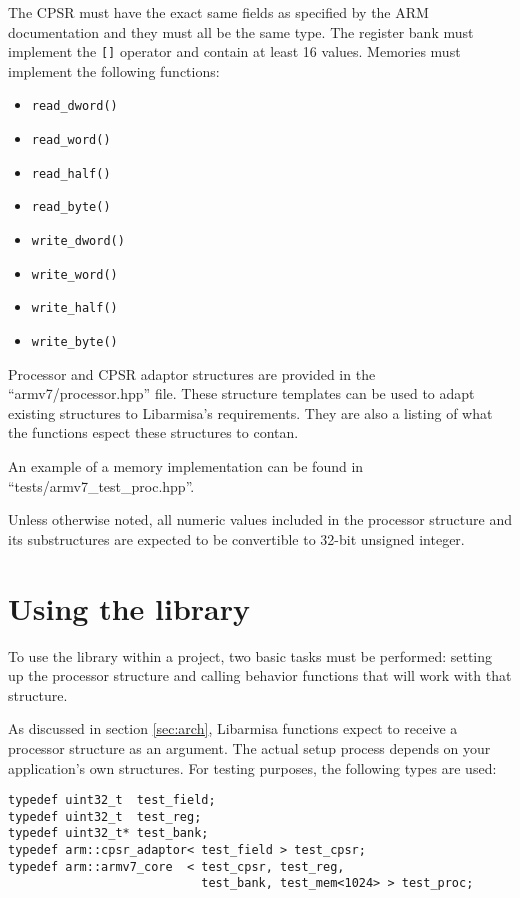 \documentclass[letterpaper,12pt]{article}
\begin{document}
The CPSR must have the exact same fields as specified by the ARM
documentation and they must all be the same type. The register bank
must implement the \verb=[]= operator and contain at least 16
values. Memories must implement the following functions:
\begin{itemize}
\item \verb=read_dword()=
\item \verb=read_word()=
\item \verb=read_half()=
\item \verb=read_byte()=
\item \verb=write_dword()=
\item \verb=write_word()=
\item \verb=write_half()=
\item \verb=write_byte()=
\end{itemize}

Processor and CPSR adaptor structures are provided in the
``armv7/processor.hpp'' file. These structure templates can be used to adapt
existing structures to Libarmisa's requirements. They are also a listing
of what the functions espect these structures to contan.

An example of a memory implementation can be found in
``tests/armv7\_test\_proc.hpp''.

Unless otherwise noted, all numeric values included in the processor
structure and its substructures are expected to be convertible to
32-bit unsigned integer.


\section{Using the library}
\label{sec:using}

To use the library within a project, two basic tasks must be
performed: setting up the processor structure and calling behavior
functions that will work with that structure.

As discussed in section \ref{sec:arch}, Libarmisa functions expect
to receive a processor structure as an argument. The actual setup
process depends on your application's own structures. For testing
purposes, the following types are used:
\begin{verbatim}
typedef uint32_t  test_field;
typedef uint32_t  test_reg;
typedef uint32_t* test_bank;
typedef arm::cpsr_adaptor< test_field > test_cpsr;
typedef arm::armv7_core  < test_cpsr, test_reg,
                           test_bank, test_mem<1024> > test_proc;
\end{verbatim}
\end{document}
